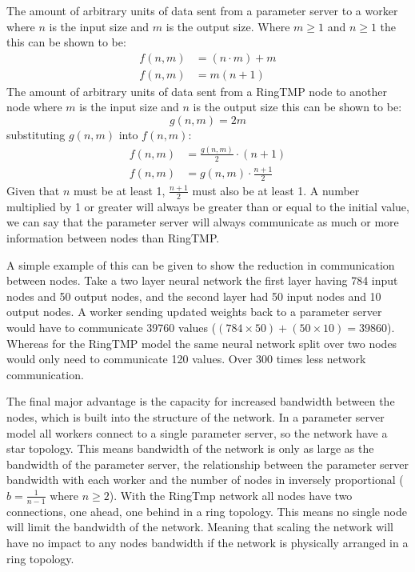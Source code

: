 The amount of arbitrary units of data sent from a parameter server to a worker
where \(n\) is the input size and \(m\) is the output size. Where \( m \geq 1\)
and \( n \geq 1\) the this can be shown to be:
\begin{equation}
    \begin{aligned}
        f(n,m) &= (n \cdot m) + m\\
        f(n,m) &= m(n+1)
    \end{aligned}
\end{equation}
The amount of arbitrary units of data sent from a RingTMP node to another node where \(m\) is
the input size and \(n\) is the output size this can be shown to be:
\begin{equation}
    g(n,m) = 2m
\end{equation}
substituting \(g(n,m)\) into \(f(n,m)\):
\begin{equation}
    \begin{aligned}
        f(n,m) &= \frac{g(n,m)}{2} \cdot (n+1)\\[1em]
        f(n,m) &= g(n,m) \cdot \frac{n+1}{2}
    \end{aligned}
\end{equation}
Given that \(n\) must be at least 1,  \( \frac{n+1}{2} \) must also be at least
1. A number multiplied by 1 or greater will always be greater than or equal to
the initial value, we can say that the parameter server will always communicate
as much or more information between nodes than RingTMP.

A simple example of this can be given to show the reduction in communication
between nodes. Take a two layer neural network the first layer having 784 input
nodes and 50 output nodes, and the second layer had 50 input nodes and 10 output
nodes. A worker sending updated weights back to a parameter server would have to
communicate 39760 values (\( (784 \times 50) + (50 \times 10) = 39860\)).
Whereas for the RingTMP model the same neural network split over two nodes would
only need to communicate 120 values. Over 300 times less network communication.

The final major advantage is the capacity for increased bandwidth between the
nodes, which is built into the structure of the network. In a parameter server
model all workers connect to a single parameter server, so the network have a
star topology. This means bandwidth of the network is only as large as the
bandwidth of the parameter server, the relationship between the parameter server
bandwidth with each worker and the number of nodes in inversely proportional
(\(b = \frac{1}{n-1} \text{ where } n \geq 2\)). With the RingTmp network all
nodes have two connections, one ahead, one behind in a ring topology. This means
no single node will limit the bandwidth of the network. Meaning that scaling the
network will have no impact to any nodes bandwidth if the network is physically
arranged in a ring topology.

